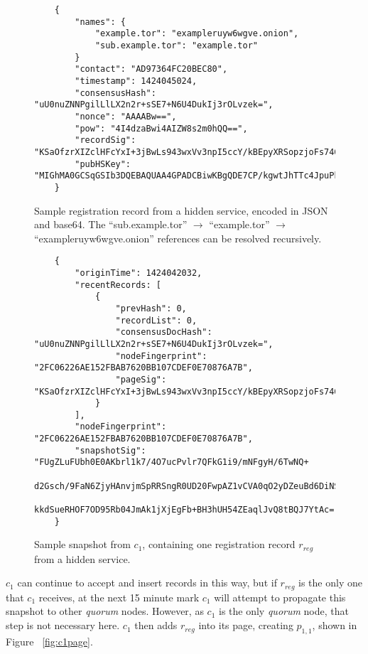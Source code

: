 \begin{figure}
	\begin{lstlisting}
	{
		"names": {
			"example.tor": "exampleruyw6wgve.onion",
			"sub.example.tor": "example.tor"
		}
		"contact": "AD97364FC20BEC80",
		"timestamp": 1424045024,
		"consensusHash": "uU0nuZNNPgilLlLX2n2r+sSE7+N6U4DukIj3rOLvzek=",
		"nonce": "AAAABw==",
		"pow": "4I4dzaBwi4AIZW8s2m0hQQ==",
		"recordSig": 	"KSaOfzrXIZclHFcYxI+3jBwLs943wxVv3npI5ccY/kBEpyXRSopzjoFs746n0tJqUpdY4Kbe6DBwERaN7ELmSSK9Pu6q8QeKzNAh+QOnKl0fKBN7fqowjkQ3ktFkR0Vuox9WrrbNTMa4+up0Np52hlbKA3zSRz4fbR9NVlh6uuQ=",
		"pubHSKey": "MIGhMA0GCSqGSIb3DQEBAQUAA4GPADCBiwKBgQDE7CP/kgwtJhTTc4JpuPkvA7Ln9wgc+fgTKgkyUp1zusxgUAn1c1MGx4YhO42KPB7dyZOf3pcRk94XsYFY1ULkF2+tf9KdNe7GFzJyMFCQENnUcVXbcwLH4vAeiGK7R/nScbCbyc9LT+VE1fbKchTL1QzLVBLqJTxhR+9YPi8x+QIFAdZ8BJs="
	}
	\end{lstlisting}
	\caption{Sample registration record from a hidden service, encoded in JSON and base64. The ``sub.example.tor'' $ \to $ ``example.tor'' $ \to $ ``exampleruyw6wgve.onion'' references can be resolved recursively.}
	\label{fig:sampleRecord}
\end{figure}

\begin{figure}
	\begin{lstlisting}
	{
		"originTime": 1424042032,
		"recentRecords: [
			{
				"prevHash": 0,
				"recordList": 0,
				"consensusDocHash": "uU0nuZNNPgilLlLX2n2r+sSE7+N6U4DukIj3rOLvzek=",
				"nodeFingerprint": "2FC06226AE152FBAB7620BB107CDEF0E70876A7B",
				"pageSig": 	"KSaOfzrXIZclHFcYxI+3jBwLs943wxVv3npI5ccY/kBEpyXRSopzjoFs746n0tJqUpdY4Kbe6DBwERaN7ELmSSK9Pu6q8QeKzNAh+QOnKl0fKBN7fqowjkQ3ktFkR0Vuox9WrrbNTMa4+up0Np52hlbKA3zSRz4fbR9NVlh6uuQ="
			}
		],
		"nodeFingerprint": "2FC06226AE152FBAB7620BB107CDEF0E70876A7B",
		"snapshotSig": "FUgZLuFUbh0E0AKbrl1k7/4O7ucPvlr7QFkG1i9/mNFgyH/6TwNQ+
			d2Gsch/9FaN6ZjyHAnvjmSpRRSngR0UD20FwpAZ1vCVA0qO2yDZeuBd6DiNS
			kkdSueRHOF7OD95Rb04JmAk1jXjEgFb+BH3hUH54ZEaqlJvQ8tBQJ7YtAc="
	}
	\end{lstlisting}
	\caption{Sample snapshot from $ c_{1} $, containing one registration record $ r_{reg} $ from a hidden service.}
	\label{fig:sampleSnapshot}
\end{figure}

$ c_{1} $ can continue to accept and insert records in this way, but if $ r_{reg} $ is the only one that $ c_{1} $ receives, at the next 15 minute mark $ c_{1} $ will attempt to propagate this snapshot to other \emph{quorum} nodes. However, as $ c_{1} $ is the only \emph{quorum} node, that step is not necessary here. $ c_{1} $ then adds $ r_{reg} $ into its page, creating $ p_{1,1} $, shown in Figure ~\ref{fig:c1page}.

